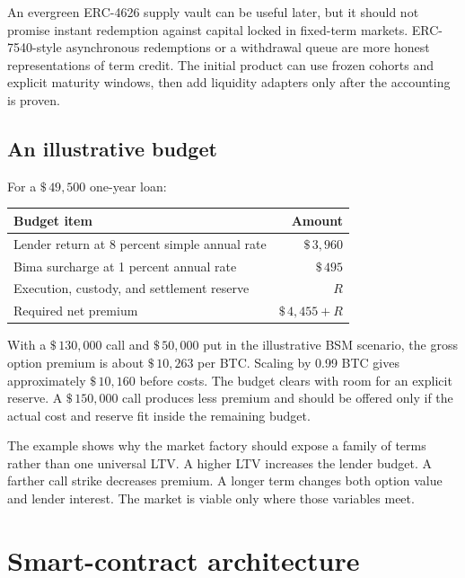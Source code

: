 \documentclass[11pt,oneside]{article}
\newcommand{\dollar}[1]{\$\,#1}
\begin{document}
An evergreen ERC-4626 supply vault can be useful later, but it should not promise instant redemption against capital locked in fixed-term markets. ERC-7540-style asynchronous redemptions or a withdrawal queue are more honest representations of term credit. The initial product can use frozen cohorts and explicit maturity windows, then add liquidity adapters only after the accounting is proven.

\subsection{An illustrative budget}

For a $\dollar{49{,}500}$ one-year loan:

\begin{center}
\begin{tabular}{@{}lr@{}}
\toprule
\textbf{Budget item} & \textbf{Amount} \\
\midrule
Lender return at 8 percent simple annual rate & $\dollar{3{,}960}$ \\
Bima surcharge at 1 percent annual rate & $\dollar{495}$ \\
Execution, custody, and settlement reserve & $R$ \\
Required net premium & $\dollar{4{,}455}+R$ \\
\bottomrule
\end{tabular}
\end{center}

With a $\dollar{130{,}000}$ call and $\dollar{50{,}000}$ put in the illustrative BSM scenario, the gross option premium is about $\dollar{10{,}263}$ per BTC. Scaling by 0.99 BTC gives approximately $\dollar{10{,}160}$ before costs. The budget clears with room for an explicit reserve. A $\dollar{150{,}000}$ call produces less premium and should be offered only if the actual cost and reserve fit inside the remaining budget.

The example shows why the market factory should expose a family of terms rather than one universal LTV. A higher LTV increases the lender budget. A farther call strike decreases premium. A longer term changes both option value and lender interest. The market is viable only where those variables meet.

\section{Smart-contract architecture}
\end{document}
